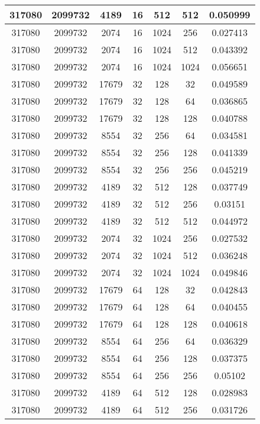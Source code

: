 \documentclass[9pt]{article}
\begin{document}
\begin{tabular}{|c|c|c|c|c|c|c| }
\hline
317080  & 2099732  & 4189  & 16  & 512  & 512  & 0.050999 \\
\hline
317080  & 2099732  & 2074  & 16  & 1024  & 256  & 0.027413 \\
\hline
317080  & 2099732  & 2074  & 16  & 1024  & 512  & 0.043392 \\
\hline
317080  & 2099732  & 2074  & 16  & 1024  & 1024  & 0.056651 \\
\hline
317080  & 2099732  & 17679  & 32  & 128  & 32  & 0.049589 \\
\hline
317080  & 2099732  & 17679  & 32  & 128  & 64  & 0.036865 \\
\hline
317080  & 2099732  & 17679  & 32  & 128  & 128  & 0.040788 \\
\hline
317080  & 2099732  & 8554  & 32  & 256  & 64  & 0.034581 \\
\hline
317080  & 2099732  & 8554  & 32  & 256  & 128  & 0.041339 \\
\hline
317080  & 2099732  & 8554  & 32  & 256  & 256  & 0.045219 \\
\hline
317080  & 2099732  & 4189  & 32  & 512  & 128  & 0.037749 \\
\hline
317080  & 2099732  & 4189  & 32  & 512  & 256  & 0.03151 \\
\hline
317080  & 2099732  & 4189  & 32  & 512  & 512  & 0.044972 \\
\hline
317080  & 2099732  & 2074  & 32  & 1024  & 256  & 0.027532 \\
\hline
317080  & 2099732  & 2074  & 32  & 1024  & 512  & 0.036248 \\
\hline
317080  & 2099732  & 2074  & 32  & 1024  & 1024  & 0.049846 \\
\hline
317080  & 2099732  & 17679  & 64  & 128  & 32  & 0.042843 \\
\hline
317080  & 2099732  & 17679  & 64  & 128  & 64  & 0.040455 \\
\hline
317080  & 2099732  & 17679  & 64  & 128  & 128  & 0.040618 \\
\hline
317080  & 2099732  & 8554  & 64  & 256  & 64  & 0.036329 \\
\hline
317080  & 2099732  & 8554  & 64  & 256  & 128  & 0.037375 \\
\hline
317080  & 2099732  & 8554  & 64  & 256  & 256  & 0.05102 \\
\hline
317080  & 2099732  & 4189  & 64  & 512  & 128  & 0.028983 \\
\hline
317080  & 2099732  & 4189  & 64  & 512  & 256  & 0.031726 \\
\hline

\end{tabular}
\end{document}
